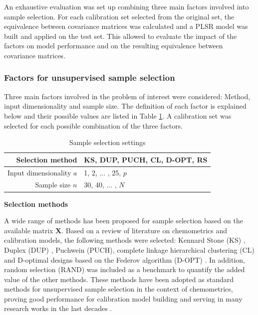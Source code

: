 \documentclass[journal=ancham,manuscript=article]{achemso}
\begin{document}
An exhaustive evaluation was set up combining three main factors involved into sample selection. For each calibration set selected from the original set, the equivalence between covariance matrices was calculated and a PLSR model was built and applied on the test set. This allowed to evaluate the impact of the factors on model performance and on the resulting equivalence between covariance matrices. 


\subsubsection{Factors for unsupervised sample selection}

Three main factors involved in the problem of interest were considered: Method, input dimensionality and sample size. The definition of each factor is explained below and their possible values are listed in Table \ref{tab_samplesel_settings_exhaustive_search}. A calibration set was selected for each possible combination of the three factors.

\begin{table}[t]
\centering
\begin{tabular}{|r|l|} 
\hline
Selection method & KS, DUP, PUCH, CL, D-OPT, RS\\
\hline
Input dimensionality $a$ & 1, 2, ... , 25, $p$ \\
\hline
Sample size $n$ & 30, 40, ... , $N$ \\
\hline

\end{tabular}
\caption{Sample selection settings}
\label{tab_samplesel_settings_exhaustive_search}
\end{table}

\textbf{Selection methods}

A wide range of methods has been proposed for sample selection based on the available matrix $\mathbf{X}$. Based on a review of literature on chemometrics and calibration models, the following methods were selected: Kennard Stone (KS) \cite{Kennard1969}, Duplex (DUP) \cite{Snee1977}, Puchwein (PUCH)\cite{Puchwein1988}, complete linkage hierarchical clustering (CL) \cite{Naes1990} and D-optimal designs based on the Federov algorithm (D-OPT) \cite{Goos2011}. In addition, random selection (RAND) was included  as a benchmark to quantify the added value of the other methods. These methods have been adopted as standard methods for unsupervised sample selection in the context of chemometrics, proving good performance for calibration model building and serving in many research works in the last decades \cite{Naes1990, Brandmaier2012, Saeys2019, Au2020, Aernouts2011}.
\end{document}

